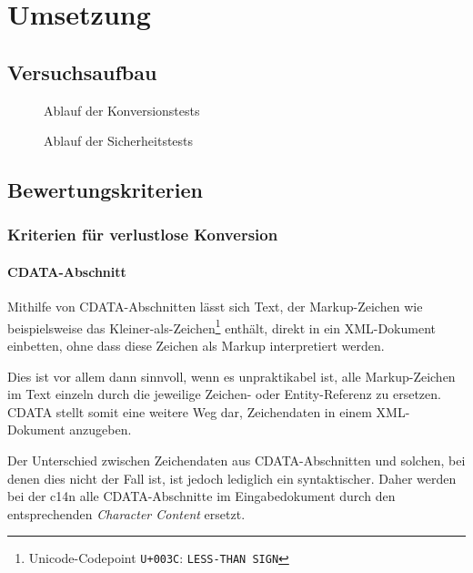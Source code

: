\chapter{Umsetzung}
\label{chap:impl}
\section{Versuchsaufbau}

\begin{figure}
    
    \caption{Ablauf der Konversionstests}
\end{figure}

\begin{figure}
    
    \caption{Ablauf der Sicherheitstests}
\end{figure}

\section{Bewertungskriterien}

\subsection{Kriterien für verlustlose Konversion}

\subsubsection{CDATA-Abschnitt}

Mithilfe von CDATA-Abschnitten lässt sich Text, der Markup-Zeichen wie beispielsweise das Kleiner-als-Zeichen\footnote{Unicode-Codepoint \texttt{U+003C}: \texttt{LESS-THAN SIGN}} enthält, direkt in ein XML-Dokument einbetten, ohne dass diese Zeichen als Markup interpretiert werden.

Dies ist vor allem dann sinnvoll, wenn es unpraktikabel ist, alle Markup-Zeichen im Text einzeln durch die jeweilige Zeichen- oder Entity-Referenz zu ersetzen. CDATA stellt somit eine weitere Weg dar, Zeichendaten in einem XML-Dokument anzugeben.\cite[Abschnitt~2.4]{maler2008xml}

Der Unterschied zwischen Zeichendaten aus CDATA-Abschnitten und solchen, bei denen dies nicht der Fall ist, ist jedoch lediglich ein syntaktischer. Daher werden bei der \acrlong{c14n} alle CDATA-Abschnitte im Eingabedokument durch den entsprechenden \emph{Character Content} ersetzt\cite[Abschnitt~2.1]{boyer2001c14n}.

